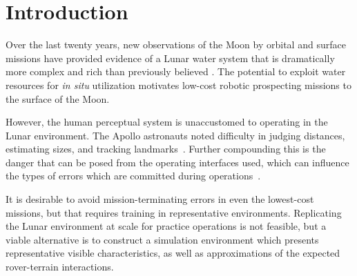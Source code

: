 \documentclass[twocolumn,letterpaper]{IEEEAerospaceCLS}  %
\begin{document}

\listoftodos



\section{Introduction}
\label{sec:intro}

Over the last twenty years, new observations of the Moon by orbital and surface missions have provided evidence of a Lunar water system that is dramatically more complex and rich than previously believed \cite{colaprete2017resource}.
The potential to exploit water resources for \emph{in situ} utilization motivates low-cost robotic prospecting missions to the surface of the Moon.

However, the human perceptual system is unaccustomed to operating in the Lunar environment.
The Apollo astronauts noted difficulty in judging distances, estimating sizes, and tracking landmarks~\cite{vaniman1991lunar}.  Further compounding this is the danger that can be posed from the operating interfaces used, which can influence the types of errors which are committed during operations~\cite{mcgovern1988human,kelly2011real}.  

It is desirable to avoid mission-terminating errors in even the lowest-cost missions, but that requires training in representative environments.  
Replicating the Lunar environment at scale for practice operations is not feasible, but a viable alternative is to construct a simulation environment which presents representative visible characteristics, as well as approximations of the expected rover-terrain interactions.
\end{document}
